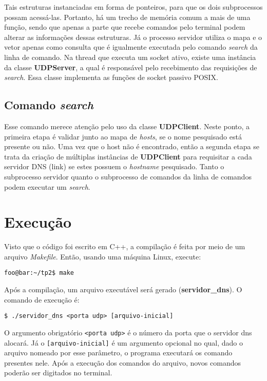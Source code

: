 \documentclass[10pt]{extarticle}
\begin{document}
Tais estruturas instanciadas em forma de ponteiros, para que os dois
subprocessos possam acessá-las.
Portanto, há um trecho de memória comum a mais de uma função, sendo que apenas
a parte que recebe comandos pelo terminal podem alterar as informações dessas
estruturas.
Já o processo servidor utiliza o mapa e o vetor apenas como consulta que é
igualmente executada pelo comando \textit{search} da linha de comando.
Na thread que executa um socket ativo, existe uma instância da classe
\textbf{UDPServer}, a qual é responsável pelo recebimento das requisições de
\textit{search}. Essa classe implementa as funções de socket passivo POSIX.

\subsection{Comando \textit{search}}
Esse comando merece atenção pelo uso da classe \textbf{UDPClient}.
Neste ponto, a primeira etapa é validar junto ao mapa de \textit{hosts}, se
o nome pesquisado está presente ou não.
Uma vez que o host não é encontrado, então a segunda etapa se trata da criação
de múltiplas instâncias de \textbf{UDPClient} para requisitar a cada servidor
DNS (link) se estes possuem o \textit{hostname} pesquisado.
Tanto o subprocesso servidor quanto o subprocesso de comandos da linha de
comandos podem executar um \textit{search}.


\section{Execução}
Visto que o código foi escrito em C++, a compilação é feita por meio de um
arquivo \textit{Makefile}.
Então, usando uma máquina Linux, execute:
\lstset{language=bash}
\begin{lstlisting}[frame=single]
foo@bar:~/tp2$ make
\end{lstlisting}

Após a compilação, um arquivo executável será gerado (\textbf{servidor\_dns}).
O comando de execução é:
\lstset{language=bash}
\begin{lstlisting}[frame=single]
$ ./servidor_dns <porta udp> [arquivo-inicial]
\end{lstlisting}

O argumento obrigatório \texttt{<porta udp>} é o número da porta que o servidor
dns alocará.
Já o \texttt{[arquivo-inicial]} é um argumento opcional no qual, dado o arquivo
nomeado por esse parâmetro, o programa executará os comando presentes nele.
Após a execução dos comandos do arquivo, novos comandos poderão ser digitados
no terminal.
\end{document}
